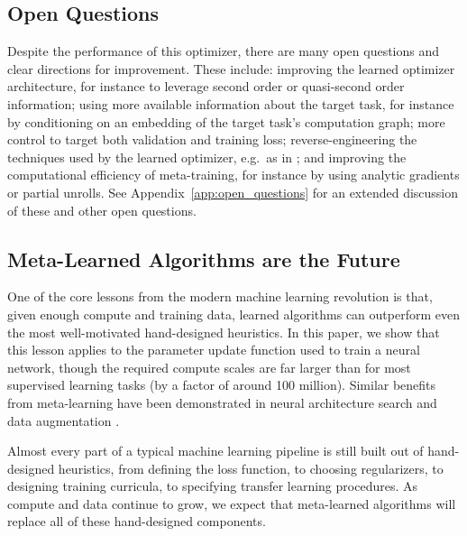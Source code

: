 \documentclass[11pt]{article}
\begin{document}
\subsection{Open Questions}
Despite the performance of this optimizer, there are many open questions and clear directions for improvement.
These include: improving the learned optimizer architecture, for instance to leverage second order or quasi-second order information; using more available information about the target task, for instance by conditioning on an embedding of the target task's computation graph;
more control to target both validation and training loss; reverse-engineering the techniques used by the learned optimizer, e.g.~as in \citet{maheswaranathan2020reverse}; and improving the computational efficiency of meta-training, for instance by using analytic gradients or partial unrolls.
See Appendix~\ref{app:open_questions} for an extended discussion of these and other open questions.


\subsection{Meta-Learned Algorithms are the Future}
One of the core lessons from the modern machine learning revolution is that, given enough compute and training data, learned algorithms can outperform even the most well-motivated hand-designed heuristics.
In this paper, we show that this lesson applies to the parameter update function used to train a neural network, though the required compute scales are far larger than for most supervised learning tasks (by a factor of around 100 million).
Similar benefits from meta-learning have been demonstrated in neural architecture search \citep{zoph2017, tan2019mnasnet} and data augmentation \citep{cubuk2018autoaugment}.

Almost every part of a typical machine learning pipeline is still built out of hand-designed heuristics, from defining the loss function, to choosing regularizers, to designing training curricula, to specifying transfer learning procedures.
As compute and data continue to grow, we expect that meta-learned algorithms will replace all of these hand-designed components.
\end{document}

